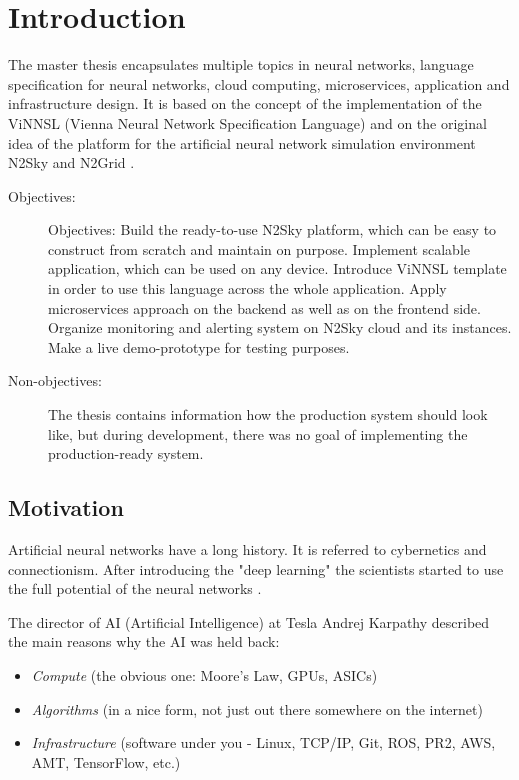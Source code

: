 \section{Introduction}\label{introduction}

The master thesis encapsulates multiple topics in neural networks, language specification for neural networks, cloud computing, microservices, application and infrastructure design. It is based on the concept of the implementation of the ViNNSL (Vienna Neural Network Specification Language) \cite{Beran2008} and on the original idea of the platform for the artificial neural network simulation environment N2Sky \cite{ravo} and N2Grid \cite{schikuta2004n2grid}.

\begin{description}
\item[Objectives:] Objectives: Build the ready-to-use N2Sky platform, which can be easy to construct from scratch and maintain on purpose. Implement scalable application, which can be used on any device. Introduce ViNNSL template in order to use this language across the whole application. Apply microservices approach on the backend as well as on the frontend side. Organize monitoring and alerting system on N2Sky cloud and its instances. Make a live demo-prototype for testing purposes. 
\item[Non-objectives:] The thesis contains information how the production system should look like, but during development, there was no goal of implementing the production-ready system.
\end{description}

\subsection{Motivation}\label{motivation}

Artificial neural networks have a long history. It is referred to cybernetics and connectionism.  After introducing the "deep learning"  the scientists started to use the full potential of the neural networks \cite{Goodfellow}. 

The director of AI (Artificial Intelligence) at Tesla Andrej Karpathy described the main reasons why the AI was held back:

\begin{itemize}
\item \emph{Compute} (the obvious one: Moore's Law, GPUs, ASICs)
\item \emph{Algorithms} (in a nice form, not just out there somewhere on the internet)
\item \emph{Infrastructure}  (software under you - Linux, TCP/IP, Git, ROS, PR2, AWS, AMT, TensorFlow, etc.) \cite{andrej}
\end{itemize}

